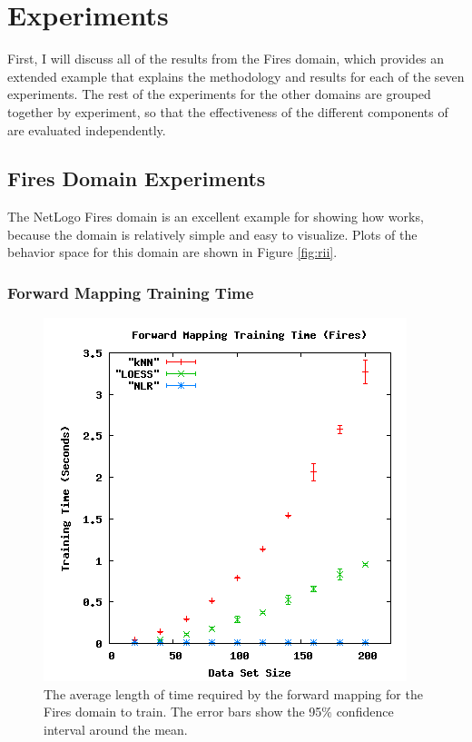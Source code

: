 \section{Experiments}\label{sec:exps}

First, I will discuss all of the results from the Fires domain, which provides an extended example that explains the methodology and results for each of the seven experiments.
The rest of the experiments  for the other domains are grouped together by experiment, so that the effectiveness of the different components of \fw are evaluated independently.

 \subsection{Fires Domain Experiments}

The NetLogo Fires domain is an excellent example for showing how \fw works, because the domain is relatively simple and easy to visualize.
Plots of the behavior space for this domain are shown in Figure \ref{fig:rii}.




\subsubsection{Forward Mapping Training Time}


\begin{figure}[ht]
\centering
\includegraphics[scale=.5]{images/results_fires/fmtraining.png}
\caption{The average length of time required by the forward mapping for the Fires domain to train.
The error bars show the 95\% confidence interval around the mean.}
\label{fig:firefmtraining}
\end{figure}

